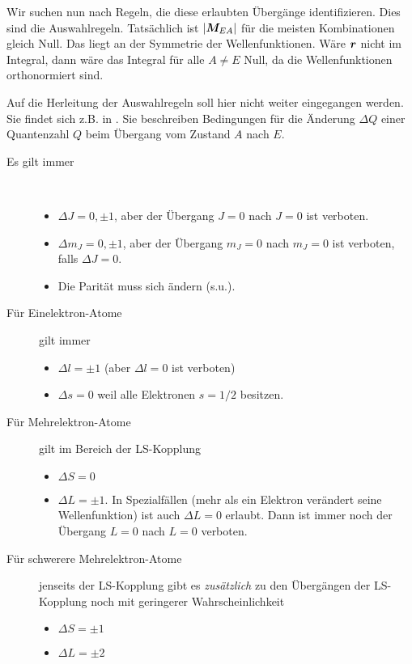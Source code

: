 Wir suchen nun nach Regeln, die diese erlaubten Übergänge identifizieren. Dies sind die Auswahlregeln. Tatsächlich ist $|\boldsymbol{M}_{EA}|$ für die meisten Kombinationen gleich Null. Das liegt an der Symmetrie der Wellenfunktionen. Wäre $\boldsymbol{r}$ nicht im Integral, dann wäre das Integral für alle $A \neq E$ Null, da die Wellenfunktionen orthonormiert sind.

Auf die Herleitung der Auswahlregeln soll hier nicht weiter eingegangen werden. Sie findet sich z.B. in \cite{Demtröder_ep3}. Sie beschreiben Bedingungen für die Änderung $\Delta Q$ einer Quantenzahl $Q$ beim Übergang vom Zustand $A$ nach $E$.

\begin{description}
    \item[Es gilt immer] \ \\
\begin{itemize}\setlength{\itemsep}{0pt}
    \item $\Delta J = 0, \pm 1$, aber der Übergang $J=0$ nach $J=0$ ist verboten.
    \item $\Delta m_J = 0, \pm 1$, aber der Übergang $m_J=0$ nach $m_J=0$ ist verboten, falls $\Delta J = 0$.
    \item Die Parität muss sich ändern (s.u.).
\end{itemize}

\item[Für Einelektron-Atome]  gilt immer  \ \\
\begin{itemize}\setlength{\itemsep}{0pt}
    \item  $\Delta l = \pm 1$ (aber  $\Delta l = 0$ ist verboten)
    \item $\Delta s = 0$ weil alle Elektronen $s=1/2$ besitzen.
\end{itemize}

\item[Für Mehrelektron-Atome] gilt im Bereich der LS-Kopplung   \ \\  
\begin{itemize}\setlength{\itemsep}{0pt}
    \item $\Delta S = 0$
    \item $\Delta L = \pm 1$. In Spezialfällen (mehr als ein Elektron verändert seine Wellenfunktion) ist auch $\Delta L = 0$ erlaubt. Dann ist immer noch der Übergang $L=0$ nach $L=0$  verboten.
\end{itemize}

\item[Für schwerere Mehrelektron-Atome]  jenseits  der LS-Kopplung gibt es \emph{zusätzlich} zu den Übergängen der LS-Kopplung noch mit geringerer Wahrscheinlichkeit    
\begin{itemize}\setlength{\itemsep}{0pt}
    \item $\Delta S  = \pm 1$
    \item $\Delta L =  \pm 2$ 
\end{itemize}
\end{description}

